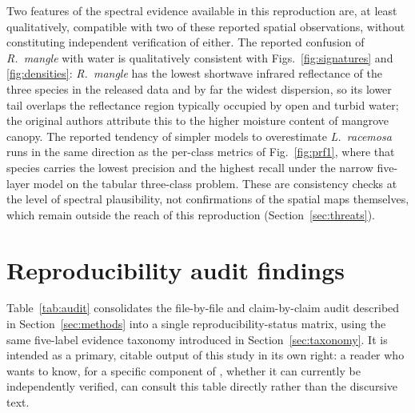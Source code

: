\documentclass[10pt,twocolumn,a4paper]{article}
\begin{document}
Two features of the spectral evidence available in this reproduction are, at least qualitatively,
compatible with two of these reported spatial observations, without constituting independent
verification of either. The reported confusion of \emph{R.\ mangle} with water is qualitatively
consistent with Figs.~\ref{fig:signatures} and \ref{fig:densities}: \emph{R.\ mangle} has the
lowest shortwave infrared reflectance of the three species in the released data and by far the
widest dispersion, so its lower tail overlaps the reflectance region typically occupied by open and
turbid water; the original authors attribute this to the higher moisture content of mangrove canopy.
The reported tendency of simpler models to overestimate \emph{L.\ racemosa} runs in the same
direction as the per-class metrics of Fig.~\ref{fig:prf1}, where that species carries the lowest
precision and the highest recall under the narrow five-layer model on the tabular three-class
problem. These are consistency checks at the level of spectral plausibility, not confirmations of
the spatial maps themselves, which remain outside the reach of this reproduction
(Section~\ref{sec:threats}).


\section{Reproducibility audit findings}
\label{sec:audit}

Table~\ref{tab:audit} consolidates the file-by-file and claim-by-claim audit described in
Section~\ref{sec:methods} into a single reproducibility-status matrix, using the same five-label evidence taxonomy
introduced in Section~\ref{sec:taxonomy}. It is intended as a primary, citable output of this study in its own
right: a reader who wants to know, for a specific component of \citet{monterrubio2025}, whether it
can currently be independently verified, can consult this table directly rather than the discursive
text.
\end{document}
